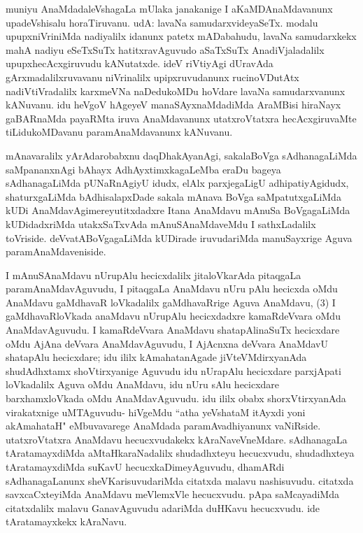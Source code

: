 \begin{artha}
muniyu AnaMdadaleVshagaLa mUlaka janakanige I aKaMDAnaMdavanunx upadeVshisalu horaTiruvanu. udA: lavaNa samudarxvideyaSeTx. modalu upupxniVriniMda nadiyalilx idanunx patetx mADabahudu, lavaNa samudarxkekx mahA nadiyu eSeTxSuTx hatitxravAguvudo aSaTxSuTx AnadiVjaladalilx upupxhecAcxgiruvudu kANutatxde. ideV riVtiyAgi dUravAda gArxmadalilxruvavanu niVrinalilx upipxruvudanunx rucinoVDutAtx nadiVtiVradalilx karxmeVNa naDedukoMDu hoVdare lavaNa samudarxvanunx kANuvanu. idu heVgoV hAgeyeV manaSAyxnaMdadiMda AraMBisi hiraNayx gaBARnaMda payaRMta iruva AnaMdavanunx utatxroVtatxra hecAcxgiruvaMte tiLidukoMDavanu paramAnaMdavanunx kANuvanu. 
\end{artha}


\begin{artha}
mAnavaralilx yArAdarobabxnu daqDhakAyanAgi, sakalaBoVga sAdhanagaLiMda saMpananxnAgi bAhayx AdhAyxtimxkagaLeMba eraDu bageya sAdhanagaLiMda pUNaRnAgiyU idudx, elAlx parxjegaLigU adhipatiyAgidudx, shaturxgaLiMda bAdhisalapxDade sakala mAnava BoVga saMpatutxgaLiMda kUDi AnaMdavAgimereyutitxdadxre Itana AnaMdavu mAnuSa BoVgagaLiMda kUDidadxriMda utakxSaTxvAda mAnuSAnaMdaveMdu I sathxLadalilx toVriside. deVvatABoVgagaLiMda kUDirade iruvudariMda manuSayxrige Aguva paramAnaMdaveniside. 
\end{artha}

\begin{artha}
I mAnuSAnaMdavu nUrupAlu hecicxdalilx jitaloVkarAda pitaqgaLa paramAnaMdavAguvudu, I pitaqgaLa AnaMdavu nUru pAlu hecicxda oMdu AnaMdavu gaMdhavaR loVkadalilx gaMdhavaRrige Aguva AnaMdavu, (3) I gaMdhavaRloVkada anaMdavu nUrupAlu hecicxdadxre kamaRdeVvara oMdu AnaMdavAguvudu. I kamaRdeVvara AnaMdavu shatapAlinaSuTx hecicxdare oMdu AjAna deVvara AnaMdavAguvudu, I AjAcnxna deVvara AnaMdavU shatapAlu hecicxdare; idu ililx kAmahatanAgade jiVteVMdirxyanAda shudAdhxtamx shoVtirxyanige Aguvudu idu nUrapAlu hecicxdare parxjApati loVkadalilx Aguva oMdu AnaMdavu, idu nUru sAlu hecicxdare barxhamxloVkada oMdu AnaMdavAguvudu. idu ililx obabx shorxVtirxyanAda virakatxnige uMTAguvudu- hiVgeMdu ``atha yeVshataM itAyxdi yoni akAmahataH" eMbuvavarege AnaMdada paramAvadhiyanunx vaNiRside. utatxroVtatxra AnaMdavu hecucxvudakekx kAraNaveVneMdare. sAdhanagaLa tAratamayxdiMda aMtaHkaraNadalilx shudadhxteyu hecucxvudu, shudadhxteya tAratamayxdiMda suKavU hecucxkaDimeyAguvudu, dhamARdi sAdhanagaLanunx sheVKarisuvudariMda citatxda malavu nashisuvudu. citatxda savxcaCxteyiMda AnaMdavu meVlemxVle hecucxvudu. pApa saMcayadiMda citatxdalilx malavu GanavAguvudu adariMda duHKavu hecucxvudu. ide tAratamayxkekx kAraNavu. 
\end{artha}%


